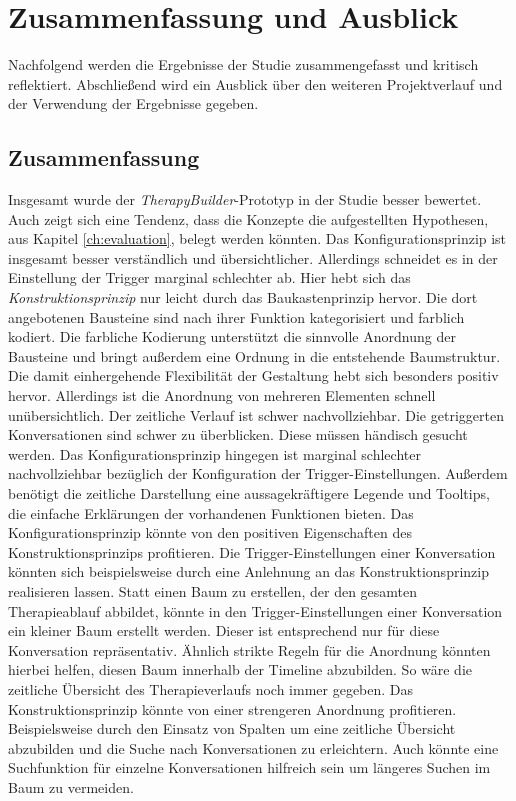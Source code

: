 
\chapter{Zusammenfassung und Ausblick}
\label{ch:FutureWork}
%

Nachfolgend werden die Ergebnisse der Studie zusammengefasst und kritisch reflektiert. Abschließend wird ein Ausblick über den weiteren Projektverlauf und der Verwendung der Ergebnisse gegeben.

\section{Zusammenfassung}
Insgesamt wurde der \emph{TherapyBuilder}-Prototyp in der Studie besser bewertet. Auch zeigt sich eine Tendenz, dass die Konzepte die aufgestellten Hypothesen, aus Kapitel \ref{ch:evaluation}, belegt werden könnten. Das Konfigurationsprinzip ist insgesamt besser verständlich und übersichtlicher. Allerdings schneidet es in der Einstellung der Trigger marginal schlechter ab. Hier hebt sich das \emph{Konstruktionsprinzip} nur leicht durch das Baukastenprinzip hervor. Die dort angebotenen Bausteine sind nach ihrer Funktion kategorisiert und farblich kodiert. Die farbliche Kodierung unterstützt die sinnvolle Anordnung der Bausteine und bringt außerdem eine Ordnung in die entstehende Baumstruktur. Die damit einhergehende Flexibilität der Gestaltung hebt sich besonders positiv hervor. Allerdings ist die Anordnung von mehreren Elementen schnell unübersichtlich. Der zeitliche Verlauf ist schwer nachvollziehbar. Die getriggerten Konversationen sind schwer zu überblicken. Diese müssen händisch gesucht werden. Das Konfigurationsprinzip hingegen ist marginal schlechter nachvollziehbar bezüglich der Konfiguration der Trigger-Einstellungen. Außerdem benötigt die zeitliche Darstellung eine aussagekräftigere Legende und Tooltips, die einfache Erklärungen der vorhandenen Funktionen bieten. Das Konfigurationsprinzip könnte von den positiven Eigenschaften des Konstruktionsprinzips profitieren. Die Trigger-Einstellungen einer Konversation könnten sich beispielsweise durch eine Anlehnung an das Konstruktionsprinzip realisieren lassen. Statt einen Baum zu erstellen, der den gesamten Therapieablauf abbildet, könnte in den Trigger-Einstellungen einer Konversation ein kleiner Baum erstellt werden. Dieser ist entsprechend nur für diese Konversation repräsentativ. Ähnlich strikte Regeln für die Anordnung könnten hierbei helfen, diesen Baum innerhalb der Timeline abzubilden. So wäre die zeitliche Übersicht des Therapieverlaufs noch immer gegeben. Das Konstruktionsprinzip könnte von einer strengeren Anordnung profitieren. Beispielsweise durch den Einsatz von Spalten um eine zeitliche Übersicht abzubilden und die Suche nach Konversationen zu erleichtern. Auch könnte eine Suchfunktion für einzelne Konversationen hilfreich sein um längeres Suchen im Baum zu vermeiden.

